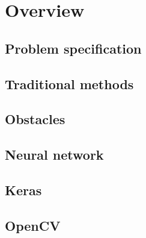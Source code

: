 \chapter{Overview}
\section{Problem specification}
\section{Traditional methods}
\section{Obstacles}
\section{Neural network}
\section{Keras}
\section{OpenCV}